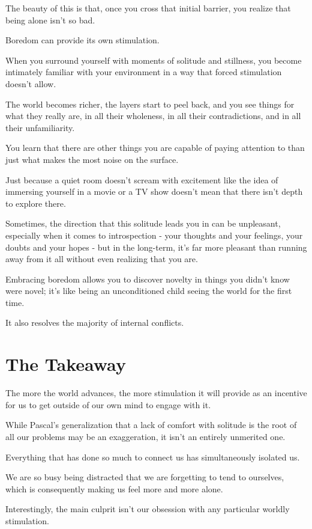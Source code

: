 \documentclass{book}
\numberwithin{equation}{section}
\begin{document}
%
The beauty of this is that, once you cross that initial barrier, you realize that being alone isn't so bad.

Boredom can provide its own stimulation.

%
When you surround yourself with moments of solitude and stillness, you become intimately familiar with your environment in a way that forced stimulation doesn't allow.

The world becomes richer, the layers start to peel back, and you see things for what they really are, in all their wholeness, in all their contradictions, and in all their unfamiliarity.

%
You learn that there are other things you are capable of paying attention to than just what makes the most noise on the surface.

Just because a quiet room doesn't scream with excitement like the idea of immersing yourself in a movie or a TV show doesn't mean that there isn't depth to explore there.

%
Sometimes, the direction that this solitude leads you in can be unpleasant, especially when it comes to introspection - your thoughts and your feelings, your doubts and your hopes - but in the long-term, it's far more pleasant than running away from it all without even realizing that you are.

%
Embracing boredom allows you to discover novelty in things you didn't know were novel; it's like being an unconditioned child seeing the world for the first time.

It also resolves the majority of internal conflicts.

\section{The Takeaway}
The more the world advances, the more stimulation it will provide as an incentive for us to get outside of our own mind to engage with it.

%
While Pascal's generalization that a lack of comfort with solitude is the root of all our problems may be an exaggeration, it isn't an entirely unmerited one.

%
Everything that has done so much to connect us has simultaneously isolated us.

We are so busy being distracted that we are forgetting to tend to ourselves, which is consequently making us feel more and more alone.

%
Interestingly, the main culprit isn't our obsession with any particular worldly stimulation.
\end{document}
